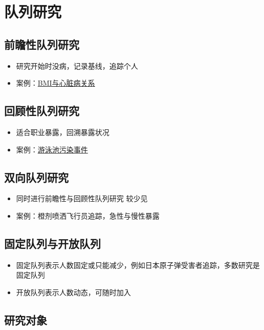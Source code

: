\documentclass[]{book}
\providecommand{\tightlist}{%
  \setlength{\itemsep}{0pt}\setlength{\parskip}{0pt}}
\begin{document}
\section{队列研究}

\subsection{前瞻性队列研究}

\begin{itemize}
\tightlist
\item
  研究开始时没病，记录基线，追踪个人
\item
  案例：\href{http://www.ncbi.nlm.nih.gov/pubmed/7654270}{BMI与心脏病关系}
\end{itemize}

\subsection{回顾性队列研究}

\begin{itemize}
\tightlist
\item
  适合职业暴露，回溯暴露状况
\item
  案例：\href{http://www.cdc.gov/parasites/giardia/}{游泳池污染事件}
\end{itemize}

\subsection{双向队列研究}

\begin{itemize}
\tightlist
\item
  同时进行前瞻性与回顾性队列研究 较少见
\item
  案例：橙剂喷洒飞行员追踪，急性与慢性暴露
\end{itemize}

\subsection{固定队列与开放队列}

\begin{itemize}
\tightlist
\item
  固定队列表示人数固定或只能减少，例如日本原子弹受害者追踪，多数研究是固定队列
\item
  开放队列表示人数动态，可随时加入
\end{itemize}

\hypertarget{-1}{%
\subsection{研究对象}\label{-1}}
\end{document}
